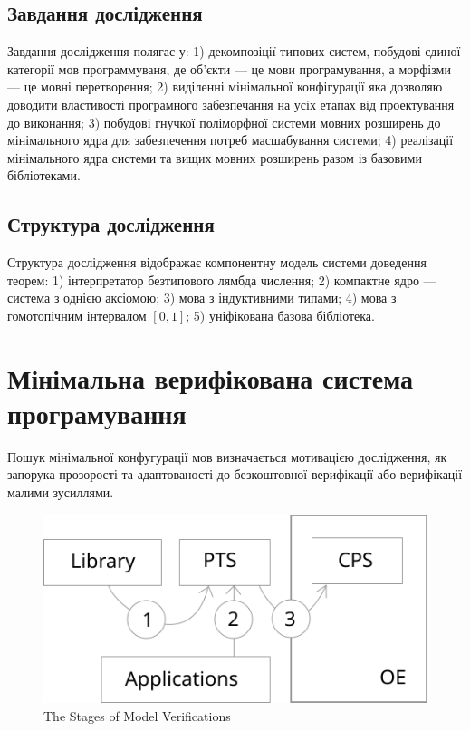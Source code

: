 \documentclass{article}
\begin{document}
\subsection{Завдання дослідження}
Завдання дослідження полягає у:
1) декомпозіції типових систем,
побудові єдиної категорії мов программуваня, де
об'єкти --- це мови програмування, а морфізми --- це мовні перетворення;
2) виділенні мінімальної конфігурації яка дозволяю доводити
властивості програмного забезпечання на усіх етапах від проектування до виконання;
3) побудові гнучкої поліморфної системи мовних розширень до
мінімального ядра для забезпечення потреб масшабування системи;
4) реалізації мінімального ядра системи та вищих мовних
розширень разом із базовими бібліотеками.

\subsection{Структура дослідження}
Структура дослідження відображає компонентну модель системи доведення теорем:
1) інтерпретатор безтипового лямбда числення;
2) компактне ядро --- система з однією аксіомою;
3) мова з індуктивними типами;
4) мова з гомотопічним інтервалом $[0,1]$;
5) уніфікована базова бібліотека.

\section{Мінімальна верифікована система програмування}

Пошук мінімальної конфугурації мов визначається мотивацією дослідження,
як запорука прозорості та адаптованості до безкоштовної верифікації
або верифікації малими зусиллями.

\begin{figure}[h]
  \centerline{\includegraphics[scale=0.28]{minimal}}
  \caption{The Stages of Model Verifications}
\end{figure}
\end{document}
